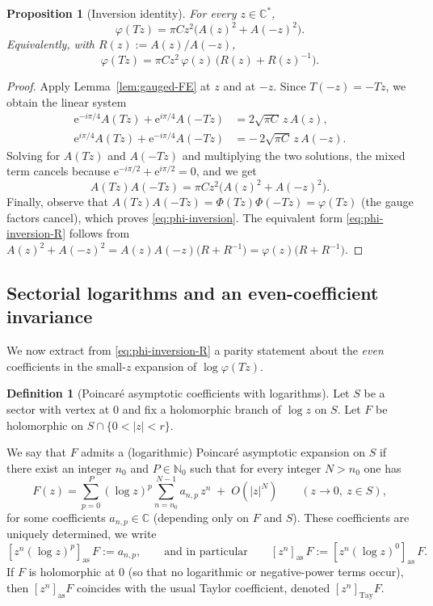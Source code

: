 \documentclass[11pt,letterpaper]{amsart}
\numberwithin{equation}{section}
\newtheorem{proposition}[theorem]{Proposition}
\theoremstyle{definition}
\newtheorem{definition}[theorem]{Definition}
\newcommand{\C}{\mathbb{C}}
\newcommand{\e}{\mathrm{e}}
\begin{document}
\begin{proposition}[Inversion identity]\label{prop:inversion-identity}
For every $z\in\C^\ast$,
\begin{equation}\label{eq:phi-inversion}
\varphi(Tz)=\pi C z^2\bigl(A(z)^2+A(-z)^2\bigr).
\end{equation}
Equivalently, with $R(z):=A(z)/A(-z)$,
\begin{equation}\label{eq:phi-inversion-R}
\varphi(Tz)=\pi C z^2\,\varphi(z)\,\bigl(R(z)+R(z)^{-1}\bigr).
\end{equation}
\end{proposition}

\begin{proof}
Apply Lemma~\ref{lem:gauged-FE} at $z$ and at $-z$. Since $T(-z)=-Tz$, we obtain the linear system
\begin{align*}
\e^{-i\pi/4}A(Tz)+\e^{i\pi/4}A(-Tz) &= 2\sqrt{\pi C}\,z\,A(z),\\
\e^{i\pi/4}A(Tz)+\e^{-i\pi/4}A(-Tz) &= -\,2\sqrt{\pi C}\,z\,A(-z).
\end{align*}
Solving for $A(Tz)$ and $A(-Tz)$ and multiplying the two solutions, the mixed term cancels because
$\e^{-i\pi/2}+\e^{i\pi/2}=0$, and we get
\[
A(Tz)A(-Tz)=\pi C z^2\bigl(A(z)^2+A(-z)^2\bigr).
\]
Finally, observe that $A(Tz)A(-Tz)=\Phi(Tz)\Phi(-Tz)=\varphi(Tz)$ (the gauge factors cancel),
which proves \eqref{eq:phi-inversion}. The equivalent form \eqref{eq:phi-inversion-R} follows from
$A(z)^2+A(-z)^2=A(z)A(-z)\bigl(R+R^{-1}\bigr)=\varphi(z)\bigl(R+R^{-1}\bigr)$.
\end{proof}

\subsection{Sectorial logarithms and an even-coefficient invariance}

We now extract from \eqref{eq:phi-inversion-R} a parity statement about the \emph{even} coefficients
in the small-$z$ expansion of $\log\varphi(Tz)$.


\begin{definition}[Poincar\'e asymptotic coefficients with logarithms]\label{def:poincare-coeff}
Let $S$ be a sector with vertex at $0$ and fix a holomorphic branch of $\log z$ on $S$.
Let $F$ be holomorphic on $S\cap\{0<|z|<r\}$.

We say that $F$ admits a (logarithmic) Poincar\'e asymptotic expansion on $S$ if there exist
an integer $n_0$ and $P\in\mathbb{N}_0$ such that for every integer $N>n_0$ one has
\[
F(z)=\sum_{p=0}^{P}(\log z)^p \sum_{n=n_0}^{N-1} a_{n,p}\,z^n \;+\; O(|z|^{N})
\qquad (z\to 0,\ z\in S),
\]
for some coefficients $a_{n,p}\in\mathbb{C}$ (depending only on $F$ and $S$).
These coefficients are uniquely determined, we write
\[
[z^n(\log z)^p]_{\mathrm{as}}\,F:=a_{n,p},
\qquad\text{and in particular}\qquad
[z^n]_{\mathrm{as}}\,F:=[z^n(\log z)^0]_{\mathrm{as}}\,F.
\]
If $F$ is holomorphic at $0$ (so that no logarithmic or negative-power terms occur),
then $[z^n]_{\mathrm{as}}F$ coincides with the usual Taylor coefficient, denoted $[z^n]_{\mathrm{Tay}}F$.
\end{definition}
\end{document}
